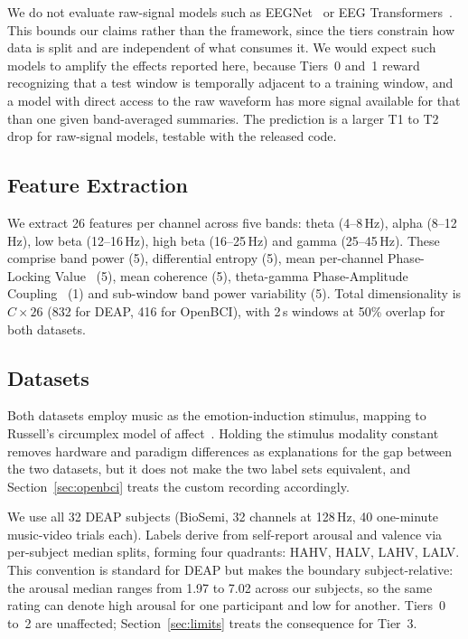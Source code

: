 \documentclass[conference,a4paper]{IEEEtran}
\begin{document}
We do not evaluate raw-signal models such as EEGNet~\cite{lawhern2018} or EEG Transformers~\cite{song2023}. This bounds our claims rather than the framework, since the tiers constrain how data is split and are independent of what consumes it. We would expect such models to amplify the effects reported here, because Tiers~0 and~1 reward recognizing that a test window is temporally adjacent to a training window, and a model with direct access to the raw waveform has more signal available for that than one given band-averaged summaries. The prediction is a larger T1 to T2 drop for raw-signal models, testable with the released code.

\subsection{Feature Extraction}

We extract 26 features per channel across five bands: theta (4--8\,Hz), alpha (8--12\,Hz), low beta (12--16\,Hz), high beta (16--25\,Hz) and gamma (25--45\,Hz). These comprise band power (5), differential entropy (5), mean per-channel Phase-Locking Value~\cite{lachaux1999} (5), mean coherence (5), theta-gamma Phase-Amplitude Coupling~\cite{canolty2010} (1) and sub-window band power variability (5). Total dimensionality is $C \times 26$ (832 for DEAP, 416 for OpenBCI), with 2\,s windows at 50\% overlap for both datasets.

\subsection{Datasets}

Both datasets employ music as the emotion-induction stimulus, mapping to Russell's circumplex model of affect~\cite{russell1980}. Holding the stimulus modality constant removes hardware and paradigm differences as explanations for the gap between the two datasets, but it does not make the two label sets equivalent, and Section~\ref{sec:openbci} treats the custom recording accordingly.

We use all 32 DEAP subjects (BioSemi, 32 channels at 128\,Hz, 40 one-minute music-video trials each). Labels derive from self-report arousal and valence via per-subject median splits, forming four quadrants: HAHV, HALV, LAHV, LALV. This convention is standard for DEAP but makes the boundary subject-relative: the arousal median ranges from 1.97 to 7.02 across our subjects, so the same rating can denote high arousal for one participant and low for another. Tiers~0 to~2 are unaffected; Section~\ref{sec:limits} treats the consequence for Tier~3.
\end{document}
